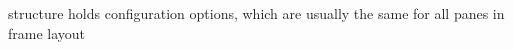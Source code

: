%
%


\section{}\label{cbcommonpaneproperties}


structure holds configuration options,
   which are usually the same for all panes in
   frame layout
 



